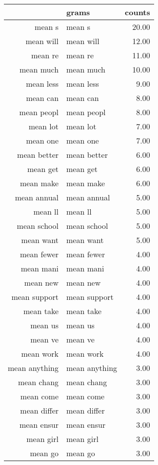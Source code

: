 \begin{table}[ht]
\centering
\begin{tabular}{rlr}
  \hline
 & grams & counts \\ 
  \hline
mean s & mean s & 20.00 \\ 
  mean will & mean will & 12.00 \\ 
  mean re & mean re & 11.00 \\ 
  mean much & mean much & 10.00 \\ 
  mean less & mean less & 9.00 \\ 
  mean can & mean can & 8.00 \\ 
  mean peopl & mean peopl & 8.00 \\ 
  mean lot & mean lot & 7.00 \\ 
  mean one & mean one & 7.00 \\ 
  mean better & mean better & 6.00 \\ 
  mean get & mean get & 6.00 \\ 
  mean make & mean make & 6.00 \\ 
  mean annual & mean annual & 5.00 \\ 
  mean ll & mean ll & 5.00 \\ 
  mean school & mean school & 5.00 \\ 
  mean want & mean want & 5.00 \\ 
  mean fewer & mean fewer & 4.00 \\ 
  mean mani & mean mani & 4.00 \\ 
  mean new & mean new & 4.00 \\ 
  mean support & mean support & 4.00 \\ 
  mean take & mean take & 4.00 \\ 
  mean us & mean us & 4.00 \\ 
  mean ve & mean ve & 4.00 \\ 
  mean work & mean work & 4.00 \\ 
  mean anything & mean anything & 3.00 \\ 
  mean chang & mean chang & 3.00 \\ 
  mean come & mean come & 3.00 \\ 
  mean differ & mean differ & 3.00 \\ 
  mean ensur & mean ensur & 3.00 \\ 
  mean girl & mean girl & 3.00 \\ 
  mean go & mean go & 3.00 \\ 

\end{tabular}
\end{table}
